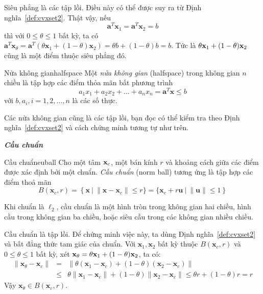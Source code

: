 Siêu phẳng là các {tập lồi}. Điều này có thể được suy ra từ Định
nghĩa~\ref{def:cvxset2}. Thật vậy, nếu
\begin{equation*}
\mathbf{a}^T\mathbf{x}_1 = \mathbf{a}^T\mathbf{x}_2 = b
\end{equation*}
thì với $0 \leq \theta \leq 1$ bất kỳ, ta có
\begin{math}
\mathbf{a}^T\mathbf{x}_{\theta} = \mathbf{a}^T(\theta \mathbf{x}_1 + (1 - \theta)\mathbf{x}_2) = \theta b + (1 - \theta) b  = b.
\end{math}
Tức là $\theta \mathbf{x}_1 + (1 - \theta)\mathbf{x}_2$ cũng là một điểm thuộc siêu phẳng đó.
\begin{mydef}{Nửa không gian}{halfspace}
Một \textit{nửa không gian} ({halfspace}) trong không gian $n$ chiều là
tập hợp các điểm thỏa mãn bất phương trình
\begin{equation*}
a_1 x_1 + a_2 x_2 + \dots + a_n x_n = \mathbf{a}^T\mathbf{x} \leq b
\end{equation*}
với $b, a_i, i = 1, 2, \dots, n$ là các số thực.
\end{mydef}

Các nửa không gian cũng là các tập lồi, bạn đọc có thể kiểm tra theo Định
nghĩa~\ref{def:cvxset2} và cách chứng minh tương tự như trên.

\textit{\textbf{Cầu chuẩn}}
\begin{mydef}{Cầu chuẩn}{euball}
Cho một tâm $\mathbf{x}_c$, một bán kính $r$ và khoảng cách giữa các điểm được
xác định bởi một chuẩn. \textit{Cầu chuẩn} (norm ball) tương ứng là tập hợp các điểm thoả
mãn
\begin{equation*}
B(\mathbf{x}_c, r) = \left\{\mathbf{x} ~\big|~ \|\mathbf{x} - \mathbf{x}_c\| \leq r \} = \{\mathbf{x}_c + r\mathbf{u} ~\big|~ \|\mathbf{u}\| \leq 1\right\}
\end{equation*}
\end{mydef}
Khi chuẩn là $\ell_2$, cầu chuẩn là một hình tròn trong không gian hai chiều,
hình cầu trong không gian ba chiều, hoặc siêu cầu trong các không gian nhiều
chiều. %

Cầu chuẩn là tập lồi. Để chứng minh việc này, ta dùng Định nghĩa~\ref{def:cvxset2} và
bất đẳng thức tam giác của chuẩn. Với $\mathbf{x}_1, \mathbf{x}_2$ bất kỳ thuộc
$B(\mathbf{x}_c, r)$ và $0 \leq \theta \leq 1$ bất kỳ, xét $\mathbf{x}_{\theta} =
\theta \mathbf{x}_1 + (1 - \theta)\mathbf{x}_2$, ta có:
\begin{eqnarray*}
\|\mathbf{x}_{\theta} - \mathbf{x}_c\| &=& \|\theta(\mathbf{x}_1 - \mathbf{x}_c)  + (1 - \theta) (\mathbf{x}_2 - \mathbf{x}_c)\| \\\
&\leq& \theta \|\mathbf{x}_1 - \mathbf{x}_c\| + (1 - \theta)\|\mathbf{x}_2 - \mathbf{x}_c\|
\leq \theta r + ( 1 - \theta) r = r
\end{eqnarray*}
Vậy $\mathbf{x}_{\theta} \in B(\mathbf{x}_c, r)$.

